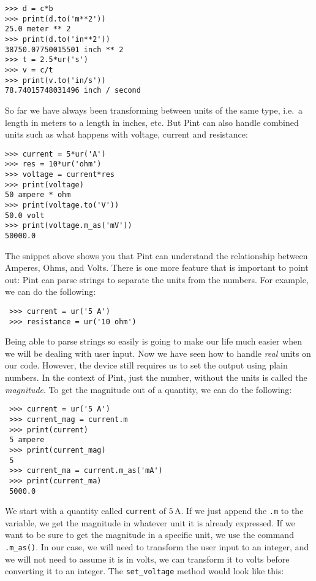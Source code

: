 \begin{verbatim}
>>> d = c*b
>>> print(d.to('m**2'))
25.0 meter ** 2
>>> print(d.to('in**2'))
38750.07750015501 inch ** 2
>>> t = 2.5*ur('s')
>>> v = c/t
>>> print(v.to('in/s'))
78.74015748031496 inch / second
\end{verbatim}

So far we have always been transforming between units of the same type, i.e.\ a length in meters to a length in inches, etc. But Pint can also handle combined units such as what happens with voltage, current and resistance:

\begin{verbatim}
>>> current = 5*ur('A')
>>> res = 10*ur('ohm')
>>> voltage = current*res
>>> print(voltage)
50 ampere * ohm
>>> print(voltage.to('V'))
50.0 volt
>>> print(voltage.m_as('mV'))
50000.0
\end{verbatim}

The snippet above shows you that Pint can understand the relationship between Amperes, Ohms, and Volts. There is one more feature that is important to point out: Pint can parse strings to separate the units from the numbers. For example, we can do the following:

\begin{verbatim}
 >>> current = ur('5 A')
 >>> resistance = ur('10 ohm')
\end{verbatim}

Being able to parse strings so easily is going to make our life much easier when we will be dealing with user input. Now we have seen how to handle \emph{real} units on our code. However, the device still requires us to set the output using plain numbers. In the context of Pint, just the number, without the units is called the \emph{magnitude}. To get the magnitude out of a quantity, we can do the following:

\begin{verbatim}
 >>> current = ur('5 A')
 >>> current_mag = current.m
 >>> print(current)
 5 ampere
 >>> print(current_mag)
 5
 >>> current_ma = current.m_as('mA')
 >>> print(current_ma)
 5000.0
\end{verbatim}

We start with a quantity called \texttt{current} of $5\,\textrm{A}$. If we just append the \texttt{.m} to the variable, we get the magnitude in whatever unit it is already expressed. If we want to be sure to get the magnitude in a specific unit, we use the command \texttt{.m\_as()}. In our case, we will need to transform the user input to an integer, and we will not need to assume it is in volts, we can transform it to volts before converting it to an integer. The \texttt{set\_voltage} method would look like this:

